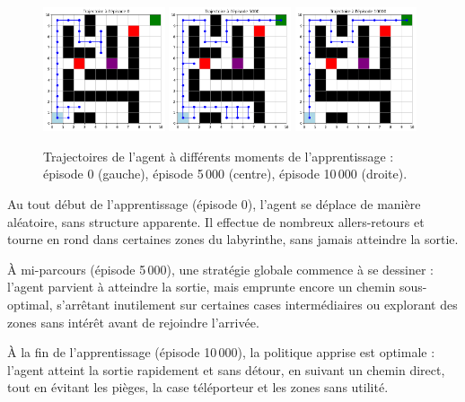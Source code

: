 \documentclass[12pt]{article}
\begin{document}
\begin{figure}[H]
    \centering
    \includegraphics[width=0.32\textwidth]{TRAJECTOIRE 0.png}
    \includegraphics[width=0.32\textwidth]{TRAJECTOIRE5K.png}
    \includegraphics[width=0.32\textwidth]{TRAJECTOIREPARFAIT.png}
    \caption{Trajectoires de l’agent à différents moments de l’apprentissage : épisode 0 (gauche), épisode 5\,000 (centre), épisode 10\,000 (droite).}
\end{figure}

Au tout début de l'apprentissage (épisode 0), l’agent se déplace de manière aléatoire, sans structure apparente. Il effectue de nombreux allers-retours et tourne en rond dans certaines zones du labyrinthe, sans jamais atteindre la sortie.

À mi-parcours (épisode 5\,000), une stratégie globale commence à se dessiner : l’agent parvient à atteindre la sortie, mais emprunte encore un chemin sous-optimal, s’arrêtant inutilement sur certaines cases intermédiaires ou explorant des zones sans intérêt avant de rejoindre l’arrivée.

À la fin de l’apprentissage (épisode 10\,000), la politique apprise est optimale : l’agent atteint la sortie rapidement et sans détour, en suivant un chemin direct, tout en évitant les pièges, la case téléporteur et les zones sans utilité.
\end{document}
